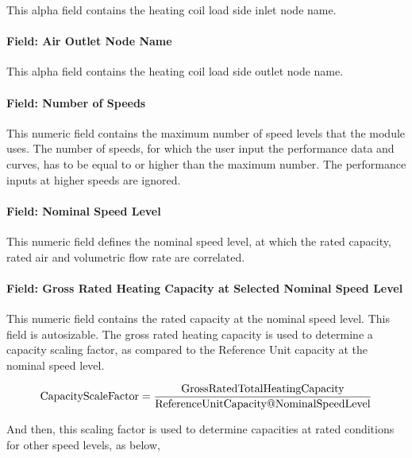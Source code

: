 This alpha field contains the heating coil load side inlet node name.

\paragraph{Field: Air Outlet Node Name}\label{field-air-outlet-node-name-15}

This alpha field contains the heating coil load side outlet node name.

\paragraph{Field: Number of Speeds}\label{field-number-of-speeds-3}

This numeric field contains the maximum number of speed levels that the module uses. The number of speeds, for which the user input the performance data and curves, has to be equal to or higher than the maximum number. The performance inputs at higher speeds are ignored.

\paragraph{Field: Nominal Speed Level}\label{field-nominal-speed-level-1}

This numeric field defines the nominal speed level, at which the rated capacity, rated air and volumetric flow rate are correlated.

\paragraph{Field: Gross Rated Heating Capacity at Selected Nominal Speed Level}\label{field-gross-rated-heating-capacity-at-selected-nominal-speed-level}

This numeric field contains the rated capacity at the nominal speed level. This field is autosizable. The gross rated heating capacity is used to determine a capacity scaling factor, as compared to the Reference Unit capacity at the nominal speed level.

\begin{equation}
\rm{CapacityScaleFactor} = \frac{{{\rm{Gross RatedTotalHeatingCapacity}}}}{{{\rm{ReferenceUnitCapacity}}@{\rm{NominalSpeedLevel}}}}
\end{equation}

And then, this scaling factor is used to determine capacities at rated conditions for other speed levels, as below,

